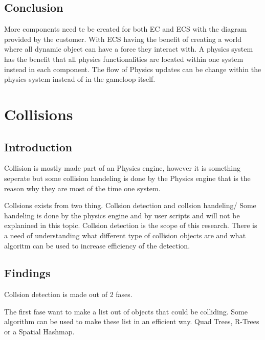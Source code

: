 \documentclass{projdoc}
\begin{document}
\subsection{Conclusion}
More components need te be created for both EC and ECS with the diagram provided by the customer. With ECS having the benefit of creating a world where all dynamic object can have a force they interact with. A physics system has the benefit that all physics functionalities are located within one system instead in each component. The flow of Physics updates can be change within the physics system instead of in the gameloop itself.

\section{Collisions}

\subsection{Introduction}

Collision is mostly made part of an Physics engine, however it is something seperate but some collision handeling is done by the Physics engine that is the reason why they are most of the time one system.

Collsions exists from two thing. Collsion detection and collsion handeling/ Some handeling is done by the physics engine and by user scripts and will not be explanined in this topic. Collsion detection is the scope of this research.
There is a need of understanding what different type of collision objects are and what algoritm can be used to increase efficiency of the detection.

\subsection{Findings}


Collsion detection is made out of 2 fases.





The first fase want to make a list out of objects that could be colliding. Some algorithm can be used to make these list in an efficient way.
Quad Trees, R-Trees or a Spatial Hashmap.
\end{document}
